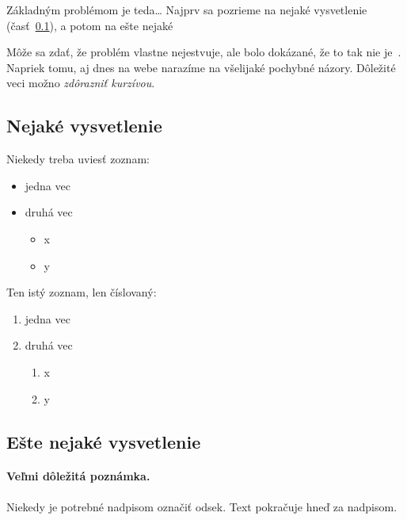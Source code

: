 \documentclass[10pt,oneside,slovak,a4paper]{article}
\begin{document}

Základným problémom je teda\ldots{} Najprv sa pozrieme na nejaké vysvetlenie (časť~\ref{ina:nejake}), a potom na ešte nejaké %

Môže sa zdať, že problém vlastne nejestvuje, ale bolo dokázané, že to tak nie je~. Napriek tomu, aj dnes na webe narazíme na všelijaké pochybné názory. Dôležité veci možno \emph{zdôrazniť kurzívou}.


\subsection{Nejaké vysvetlenie} \label{ina:nejake}
\cite{Coplien:MPD}
Niekedy treba uviesť zoznam:

\begin{itemize}
\item jedna vec
\item druhá vec
	\begin{itemize}
	\item x
	\item y
	\end{itemize}
\end{itemize}

Ten istý zoznam, len číslovaný:

\begin{enumerate}
\item jedna vec
\item druhá vec
	\begin{enumerate}
	\item x
	\item y
	\end{enumerate}
\end{enumerate}


\subsection{Ešte nejaké vysvetlenie} \label{ina:este}

\paragraph{Veľmi dôležitá poznámka.}
Niekedy je potrebné nadpisom označiť odsek. Text pokračuje hneď za nadpisom.
\end{document}
